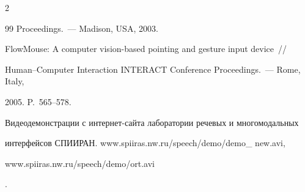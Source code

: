 \begin{multicols}{2}
{{\begin{thebibliography}{99}
Proceedings.~--- Madison, USA, 2003.









FlowMouse: A computer vision-based pointing and gesture input device~// 


Human--Computer Interaction INTERACT Conference Proceedings.~--- Rome, Italy, 


2005. P.~565--578.





\label{end\stat}







Видеодемонстрации с интернет-сайта лаборатории речевых и многомодальных 


интерфейсов \mbox{СПИИРАН}. {\sf www.spiiras.nw.ru/speech/demo/demo\_ new.avi}, {\sf 


www.spiiras.nw.ru/speech/demo/ort.avi}.


 \end{thebibliography}


}


}








\end{multicols}


